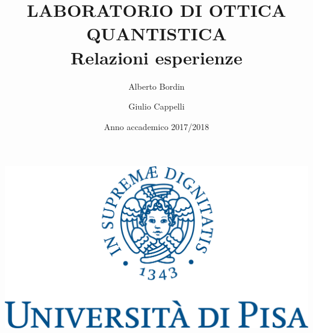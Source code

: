 \documentclass[italian]{article}
\title{\vspace{-0.2cm}\textbf{LABORATORIO DI OTTICA QUANTISTICA}\\\vspace{0.8cm}Relazioni esperienze\vspace{1cm}}
\author{\vspace{0.3cm}Alberto Bordin \and Giulio Cappelli}
\date{Anno accademico 2017/2018}
\begin{document}
\maketitle
\begin{center}
	{\includegraphics[scale=0.35]{logo.png}}
\end{center}
\vspace{-9cm}
\thispagestyle{empty}
\end{document}
